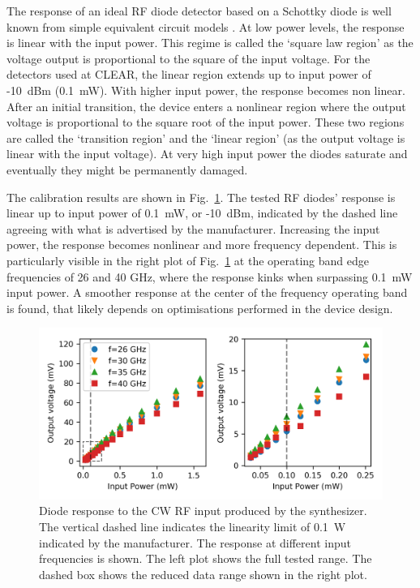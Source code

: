 The response of an ideal RF diode detector based on a Schottky diode is well known from simple equivalent circuit models \cite{schottky_diodes_temp_extremes}. At low power levels, the response is linear with the input power. This regime is called the `square law region' as the voltage output is proportional to the square of the input voltage. For the detectors used at CLEAR, the linear region extends up to input power of -10~dBm \cite{diodes_datasheet} (0.1~mW). With higher input power, the response becomes non linear. After an initial transition, the device enters a nonlinear region where the output voltage is proportional to the square root of the input power. These two regions are called the `transition region' and the `linear region' (as the output voltage is linear with the input voltage). At very high input power the diodes saturate and eventually they might be permanently damaged. 

The calibration results are shown in Fig.~\ref{fig:diode_cal_data}. The tested RF diodes' response is linear up to input power of 0.1~mW, or -10~dBm, indicated by the dashed line agreeing with what is advertised by the manufacturer. Increasing the input power, the response becomes nonlinear and more frequency dependent. This is particularly visible in the right plot of Fig.~\ref{fig:diode_cal_data} at the operating band edge frequencies of 26 and 40 GHz, where the response kinks when surpassing 0.1~mW input power. A smoother response at the center of the frequency operating band is found, that likely depends on optimisations performed in the device design. 


\begin{figure}[!b]
\centering
\includegraphics[scale=1, keepaspectratio]{pictures/diode_cal_data}
\caption{Diode response to the CW RF input produced by the synthesizer. The vertical dashed line indicates the linearity limit of 0.1~W indicated by the manufacturer. The response at different input frequencies is shown. The left plot shows the full tested range. The dashed box shows the reduced data range shown in the right plot.}\label{fig:diode_cal_data}
\end{figure}


